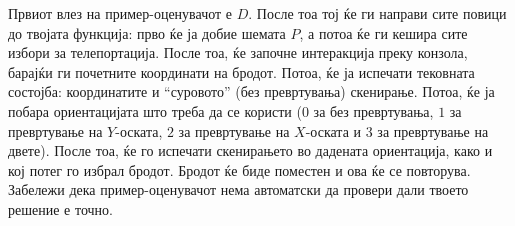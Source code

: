 \documentclass[12pt]{article}
\begin{document}
Првиот влез на пример-оценувачот е $D$. После тоа тој ќе ги направи сите повици до твојата функција: прво ќе ја добие шемата $P$, а потоа ќе ги кешира сите избори за телепортација. После тоа, ќе започне интеракција преку конзола, барајќи ги почетните координати на бродот. Потоа, ќе ја испечати тековната состојба: координатите и ``суровото'' (без превртувања) скенирање. Потоа, ќе ја побара ориентацијата што треба да се користи ($0$ за без превртувања, $1$ за превртување на $Y$-оската, $2$ за превртување на $X$-оската и $3$ за превртување на двете). После тоа, ќе го испечати скенирањето во дадената ориентација, како и кој потег го избрал бродот. Бродот ќе биде поместен и ова ќе се повторува. Забележи дека пример-оценувачот нема автоматски да провери дали твоето решение е точно.
\end{document}
